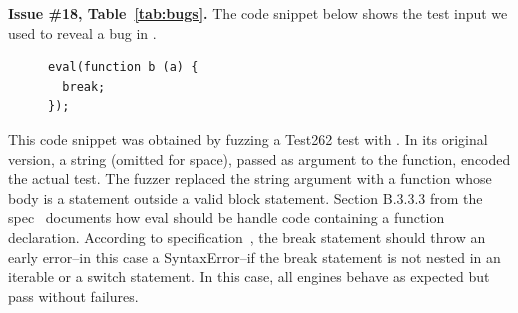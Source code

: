 \documentclass[10pt,conference,anonymous]{IEEEtran}
\begin{document}
\vspace{1ex}\noindent\textbf{Issue \#18, Table~\ref{tab:bugs}.}  The
code snippet below shows the test input we used to reveal a bug in
\veight{}.

\begin{figure}[h!]
  \centering
  \scriptsize
  \begin{lstlisting}
eval(function b (a) {
  break;
});
  \end{lstlisting}
  \normalsize
\end{figure}

This code snippet was obtained by fuzzing a Test262 test with
\quickfuzz. In its original version, a string (omitted for space),
passed as argument to the  function, encoded the actual
test. The fuzzer replaced the string argument with a function whose
body is a  statement outside a valid block
statement. Section B.3.3.3 from the spec~\cite{spec-b333} documents
how eval should be handle code containing a function declaration.
According to specification~\cite{break-statement}, the break statement
should throw an early error--in this case a SyntaxError--if the break
statement is not nested in an iterable or a switch statement. In
this case, all engines behave as expected but \veight{} pass without
failures.

\end{document}
